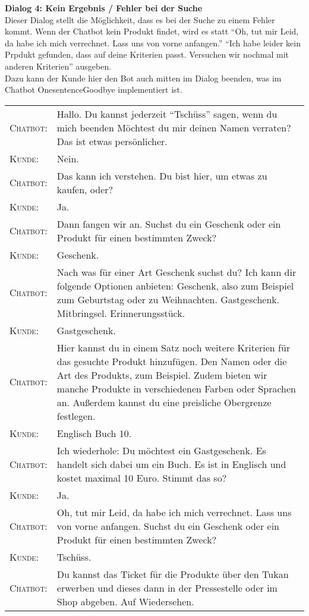 \Large\textbf{Dialog 4: Kein Ergebnis / Fehler bei der Suche}\\
\normalsize
Dieser Dialog stellt die Möglichkeit, dass es bei der Suche zu einem Fehler kommt. Wenn der Chatbot kein Produkt findet, wird es statt "`Oh, tut mir Leid, da habe ich mich verrechnet. Lass uns von vorne anfangen."' "`Ich habe leider kein Prpdukt gefunden, dass auf deine Kriterien passt. Versuchen wir nochmal mit anderen Kriterien"' ausgeben.\\
Dazu kann der Kunde hier den Bot auch mitten im Dialog beenden, was im Chatbot OnesentenceGoodbye implementiert ist.
\vspace{8pt}
\begin{center}
\begin{tabular}{p{}p{}}
	\textsc{Chatbot:} & Hallo. Du kannst jederzeit "`Tschüss"' sagen, wenn du mich beenden  Möchtest du mir deinen Namen verraten? Das ist etwas persönlicher. \\
	\textsc{Kunde:} & Nein.\\
	\textsc{Chatbot:} & Das kann ich verstehen. Du bist hier, um etwas zu kaufen, oder? \\
	\textsc{Kunde:} & Ja. \\
	\textsc{Chatbot:} & Dann fangen wir an. Suchst du ein Geschenk oder ein Produkt für einen bestimmten Zweck? \\
	\textsc{Kunde:} & Geschenk.\\
	\textsc{Chatbot:} & Nach was für einer Art Geschenk suchst du? Ich kann dir folgende Optionen anbieten: Geschenk, also zum Beispiel zum Geburtstag oder zu Weihnachten. Gastgeschenk. Mitbringsel. Erinnerungsstück.\\
	\textsc{Kunde:} & Gastgeschenk. \\
	\textsc{Chatbot:} & Hier kannst du in einem Satz noch weitere Kriterien für das gesuchte Produkt hinzufügen. Den Namen oder die Art des Produkts, zum Beispiel. Zudem bieten wir manche Produkte in verschiedenen Farben oder Sprachen an. Außerdem kannst du eine preisliche Obergrenze festlegen.\\
	\textsc{Kunde:} & Englisch Buch 10.\\
	\textsc{Chatbot:} & Ich wiederhole: Du möchtest ein Gastgeschenk. Es handelt sich dabei um ein Buch. Es ist in Englisch und kostet maximal 10 Euro. Stimmt das so? \\
	\textsc{Kunde:} & Ja. \\
	\textsc{Chatbot:} & Oh, tut mir Leid, da habe ich mich verrechnet. Lass uns von vorne anfangen. Suchst du ein Geschenk oder ein Produkt für einen bestimmten Zweck? \\
	\textsc{Kunde:} & Tschüss. \\
	\textsc{Chatbot:} & Du kannst das Ticket für die Produkte über den Tukan erwerben und dieses dann in der Pressestelle oder im Shop abgeben. Auf Wiedersehen.\\
	\end{tabular}
\end{center}


